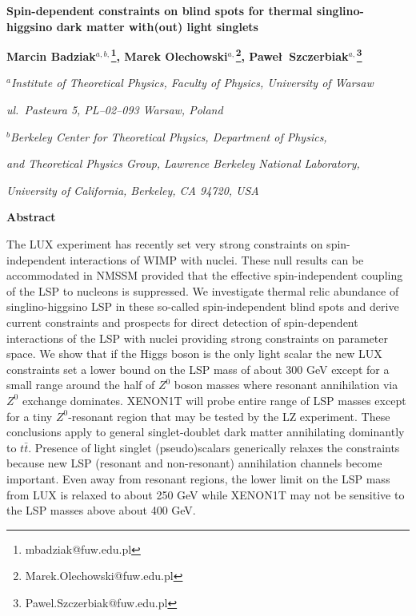 \documentclass[12pt,twoside]{article}
\begin{document}
\vspace*{1cm}

\begin{center}
\Large\bf Spin-dependent constraints on blind spots for thermal 
singlino-higgsino dark matter with(out) light singlets
\end{center} 



\vspace*{2mm}


 

\vspace*{5mm} \noindent
\vskip 0.5cm
\centerline{\bf
Marcin Badziak${}^{a,b,}$\footnote[1]{mbadziak@fuw.edu.pl},
Marek Olechowski${}^{a,}$\footnote[2]{Marek.Olechowski@fuw.edu.pl},
Pawe\l\ Szczerbiak${}^{a,}$\footnote[3]{Pawel.Szczerbiak@fuw.edu.pl}
}
\vskip 5mm

\centerline{${}^a$\em Institute of Theoretical Physics,
Faculty of Physics, University of Warsaw} 
\centerline{\em ul.~Pasteura 5, PL--02--093 Warsaw, Poland} 
\centerline{${}^b$\em Berkeley Center for Theoretical Physics, Department of Physics,}
\centerline{\em and Theoretical Physics Group, Lawrence Berkeley National Laboratory,}
\centerline{\em University of California, Berkeley, CA 94720, USA}


\vskip 1cm

\centerline{\bf Abstract}
\vskip 3mm

The LUX experiment has recently set very strong constraints on spin-independent interactions of WIMP with nuclei. These null results can be
accommodated in NMSSM provided that the effective spin-independent coupling of the LSP to nucleons is suppressed. We investigate thermal relic
abundance of singlino-higgsino LSP in these so-called spin-independent blind spots and derive current constraints and prospects for direct detection
of spin-dependent interactions of the LSP with nuclei providing strong constraints on parameter space. We show that if the Higgs boson is the only
light
scalar the new LUX constraints set a lower bound on the LSP mass of about 300 GeV except for a small range around the half of $Z^0$ boson
masses
where resonant
annihilation via $Z^0$
exchange dominates. XENON1T will probe entire range of LSP masses except for a tiny $Z^0$-resonant region that may be
tested
by the LZ experiment.
These conclusions apply to general singlet-doublet dark matter annihilating dominantly to $t\bar{t}$.
Presence of light singlet (pseudo)scalars generically relaxes the constraints because new LSP (resonant and non-resonant) annihilation channels
become important. 
Even away from resonant regions, the lower limit on the LSP mass from LUX is relaxed to about 250 GeV while XENON1T may not be sensitive to the LSP
masses above about 400 GeV. 
\end{document}
